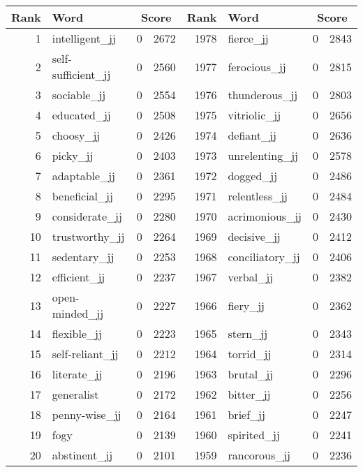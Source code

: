 \begin{table}[tbp]
    \begin{tabular}{| rlr@{.}l | rlr@{.}l |}
    \hline
    \textbf{Rank} & \textbf{Word} & \multicolumn{2}{c|}{\textbf{Score}} & \textbf{Rank} & \textbf{Word} & \multicolumn{2}{c|}{\textbf{Score}} \\
    \hline
    1 & intelligent\_jj & 0 & 2672    &    1978 & fierce\_jj & 0 & 2843 \\
    2 & self-sufficient\_jj & 0 & 2560    &    1977 & ferocious\_jj & 0 & 2815 \\
    3 & sociable\_jj & 0 & 2554    &    1976 & thunderous\_jj & 0 & 2803 \\
    4 & educated\_jj & 0 & 2508    &    1975 & vitriolic\_jj & 0 & 2656 \\
    5 & choosy\_jj & 0 & 2426    &    1974 & defiant\_jj & 0 & 2636 \\
    6 & picky\_jj & 0 & 2403    &    1973 & unrelenting\_jj & 0 & 2578 \\
    7 & adaptable\_jj & 0 & 2361    &    1972 & dogged\_jj & 0 & 2486 \\
    8 & beneficial\_jj & 0 & 2295    &    1971 & relentless\_jj & 0 & 2484 \\
    9 & considerate\_jj & 0 & 2280    &    1970 & acrimonious\_jj & 0 & 2430 \\
    10 & trustworthy\_jj & 0 & 2264    &    1969 & decisive\_jj & 0 & 2412 \\
    11 & sedentary\_jj & 0 & 2253    &    1968 & conciliatory\_jj & 0 & 2406 \\
    12 & efficient\_jj & 0 & 2237    &    1967 & verbal\_jj & 0 & 2382 \\
    13 & open-minded\_jj & 0 & 2227    &    1966 & fiery\_jj & 0 & 2362 \\
    14 & flexible\_jj & 0 & 2223    &    1965 & stern\_jj & 0 & 2343 \\
    15 & self-reliant\_jj & 0 & 2212    &    1964 & torrid\_jj & 0 & 2314 \\
    16 & literate\_jj & 0 & 2196    &    1963 & brutal\_jj & 0 & 2296 \\
    17 & generalist & 0 & 2172    &    1962 & bitter\_jj & 0 & 2256 \\
    18 & penny-wise\_jj & 0 & 2164    &    1961 & brief\_jj & 0 & 2247 \\
    19 & fogy & 0 & 2139    &    1960 & spirited\_jj & 0 & 2241 \\
    20 & abstinent\_jj & 0 & 2101    &    1959 & rancorous\_jj & 0 & 2236 \\

\end{tabular}
\end{table}
